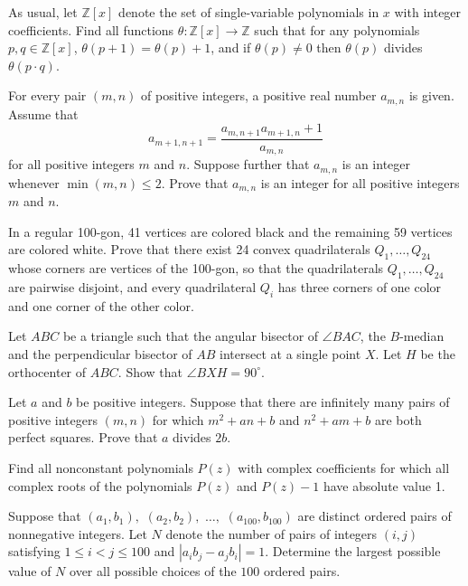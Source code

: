 \documentclass[11pt]{scrartcl}
\begin{document}
\begin{problem}[620629352845047]
As usual, let ${\mathbb Z}[x]$ denote the set of single-variable polynomials in $x$ with integer coefficients. Find all functions $\theta : {\mathbb Z}[x] \to {\mathbb Z}$ such that for any polynomials $p,q \in {\mathbb Z}[x]$,
$\theta(p+1) = \theta(p)+1$, and
if $\theta(p) \neq 0$ then $\theta(p)$ divides $\theta(p \cdot q)$.
\end{problem}
\begin{problem}[5180896359975323937]
For every pair $(m, n)$ of positive integers, a positive real number $a_{m, n}$ is given. Assume that
\[a_{m+1, n+1} = \frac{a_{m, n+1} a_{m+1, n} + 1}{a_{m, n}}\]for all positive integers $m$ and $n$. Suppose further that $a_{m, n}$ is an integer whenever $\min(m, n) \le 2$. Prove that $a_{m, n}$ is an integer for all positive integers $m$ and $n$.
\end{problem}
\begin{problem}[2749225075653830789]
	In a regular 100-gon, 41 vertices are colored black and the remaining 59 vertices are colored white. Prove that there exist 24 convex quadrilaterals $Q_{1}, \ldots, Q_{24}$ whose corners are vertices of the 100-gon, so that
the quadrilaterals $Q_{1}, \ldots, Q_{24}$ are pairwise disjoint, and
every quadrilateral $Q_{i}$ has three corners of one color and one corner of the other color.
\end{problem}
\begin{problem}[264456837378391]
Let $ABC$ be a triangle such that the angular bisector of $\angle BAC$, the $B$-median and the perpendicular bisector of $AB$ intersect at a single point $X$. Let $H$ be the orthocenter of $ABC$. Show that $\angle BXH = 90^{\circ}$.
\end{problem}
\begin{problem}[8948164820835424145]
Let $a$ and $b$ be positive integers. Suppose that there are infinitely many pairs of positive integers $(m,n)$ for which $m^2+an+b$ and $n^2+am+b$ are both perfect squares. Prove that $a$ divides $2b$.
\end{problem}
\begin{problem}[16134758174084]
Find all nonconstant polynomials $P(z)$ with complex coefficients for which all complex roots of the polynomials $P(z)$ and $P(z) - 1$ have absolute value 1.

\end{problem}
\begin{problem}[2556841339462610604]
	Suppose that $(a_1,b_1),$ $(a_2,b_2),$ $\dots,$ $(a_{100},b_{100})$ are distinct ordered pairs of nonnegative integers. Let $N$ denote the number of pairs of integers $(i,j)$ satisfying $1\leq i<j\leq 100$ and $|a_ib_j-a_jb_i|=1$. Determine the largest possible value of $N$ over all possible choices of the $100$ ordered pairs.
\end{problem}
\end{document}
